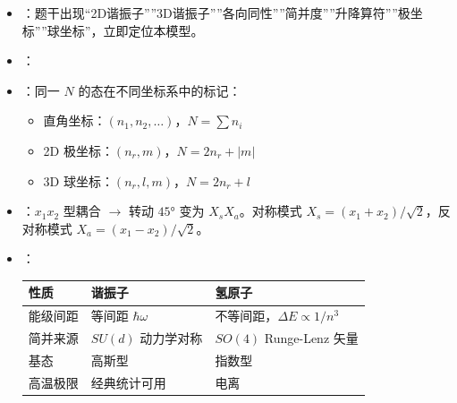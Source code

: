 \begin{tipbox}[快速识别与解题技巧]
\begin{itemize}
    \item {}：题干出现``2D谐振子''''3D谐振子''''各向同性''''简并度''''升降算符''''极坐标''''球坐标''，立即定位本模型。
    \item {}：
    \begin{center}
    \end{center}
    \item {}：同一 $N$ 的态在不同坐标系中的标记：
    \begin{itemize}[nosep]
        \item 直角坐标：$(n_1,n_2,\ldots)$，$N=\sum n_i$
        \item 2D 极坐标：$(n_r,m)$，$N=2n_r+|m|$
        \item 3D 球坐标：$(n_r,l,m)$，$N=2n_r+l$
    \end{itemize}
    \item {}：$x_1x_2$ 型耦合 $\to$ 转动 $45°$ 变为 $X_sX_a$。对称模式 $X_s=(x_1+x_2)/\sqrt2$，反对称模式 $X_a=(x_1-x_2)/\sqrt2$。
    \item {}：
    \begin{center}
    \begin{tabular}{lll}
    \toprule
    \textbf{性质} & \textbf{谐振子} & \textbf{氢原子} \\
    \midrule
    能级间距 & 等间距 $\hbar\omega$ & 不等间距，$\Delta E\propto1/n^3$ \\
    简并来源 & $SU(d)$ 动力学对称 & $SO(4)$ Runge-Lenz 矢量 \\
    基态 & 高斯型 & 指数型 \\
    高温极限 & 经典统计可用 & 电离 \\
    \bottomrule
    \end{tabular}
    \end{center}
\end{itemize}
\end{tipbox}


